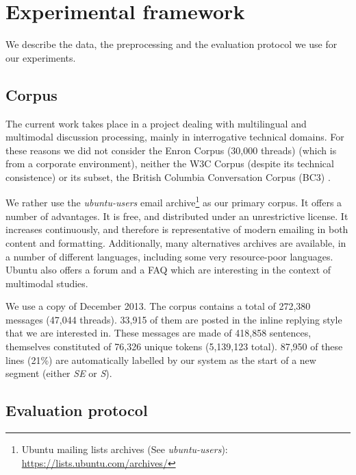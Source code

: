 \section{Experimental framework}
\label{sec:experimentalframework}
We describe the data, the preprocessing and the evaluation protocol we use for our experiments.

\subsection{Corpus}

The current work takes place in a project dealing with multilingual and multimodal discussion processing, mainly in interrogative technical domains. 
For these reasons we did not consider the Enron Corpus (30,000 threads) \cite{klimt:2004:enron} (which is from a corporate environment), 
neither the W3C Corpus (despite its technical consistence) or its subset, the British Columbia Conversation Corpus (BC3) \cite{ulrich:2008:bc3}.

We rather use the \textit{ubuntu-users} email archive\footnote{Ubuntu mailing lists archives (See \textit{ubuntu-users}): \url{https://lists.ubuntu.com/archives/}} as our primary corpus. It offers a number of advantages. It is free, and distributed under an unrestrictive license. It increases continuously, and therefore is representative of modern emailing in both content and formatting. Additionally, many alternatives archives are available, in a number of different languages, including some very resource-poor languages. Ubuntu also offers a forum and a FAQ which are interesting in the context of multimodal studies. 

We use a copy of December 2013.
The corpus contains a total of 272,380 messages (47,044 threads). 33,915 of them are posted in the inline replying style that we are interested in. These messages are made of 418,858 sentences, themselves constituted of 76,326 unique tokens (5,139,123 total). 87,950 of these lines (21\%) are automatically labelled by our system as the start of a new segment (either \textit{SE} or \textit{S}).
\subsection{Evaluation protocol}

